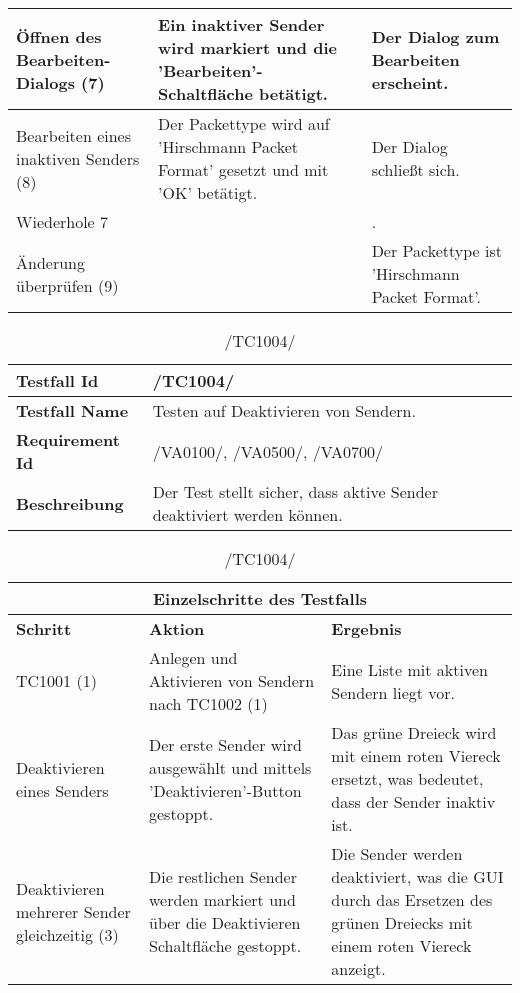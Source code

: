 \begin{table}[h]
\begin{center}
\begin{tabular}{|p{2.5cm}|p{5cm}|p{4.55cm}|}
\hline
Öffnen des Bearbeiten-Dialogs (7) & Ein inaktiver Sender wird markiert und die
 'Bearbeiten'-Schaltfläche betätigt. & Der Dialog zum Bearbeiten erscheint.
\\
\hline
Bearbeiten eines inaktiven Senders (8) & Der Packettype wird auf 'Hirschmann
Packet Format' gesetzt und mit 'OK' betätigt. & Der Dialog schließt sich.
\\
\hline
Wiederhole 7 & &.
\\
\hline
Änderung überprüfen (9) &  & Der Packettype ist 'Hirschmann
Packet Format'.
\\
\hline
\end{tabular}
\end{center}
\end{table}

\begin{table}[h]
\caption{/TC1004/}
\label{tab:TC1004}
\begin{center}
\begin{tabular}{|p{3.5cm}|p{9cm}|}
\hline
\textbf{Testfall Id} & /TC1004/\\
\hline
\textbf{Testfall Name} & Testen auf Deaktivieren von Sendern.
\\
\hline
\textbf{Requirement Id} & /VA0100/, /VA0500/, /VA0700/\\
\hline
\textbf{Beschreibung} & Der Test stellt sicher, dass aktive Sender deaktiviert
werden können.
\\
\hline
\end{tabular}
\begin{tabular}{|p{2.5cm}|p{5cm}|p{4.55cm}|}
\multicolumn{3}{|c|}{\textbf{Einzelschritte des Testfalls}} \\
\hline
\textbf{Schritt} & \textbf{Aktion} & \textbf{Ergebnis}\\
\hline
TC1001 (1) & Anlegen und Aktivieren von Sendern nach TC1002 (1) & Eine Liste
 mit aktiven Sendern liegt vor.
\\
\hline
Deaktivieren eines Senders & Der erste Sender wird ausgewählt und mittels
 'Deaktivieren'-Button gestoppt. & Das grüne Dreieck wird mit einem roten Viereck
 ersetzt, was bedeutet, dass der Sender inaktiv ist.
 \\
\hline
Deaktivieren mehrerer Sender gleichzeitig (3) & Die restlichen Sender werden
markiert und über die Deaktivieren Schaltfläche gestoppt. & Die Sender werden
deaktiviert, was die GUI durch das Ersetzen des grünen Dreiecks mit einem roten
Viereck anzeigt.
 \\
\hline
\end{tabular}
\end{center}
\end{table}

